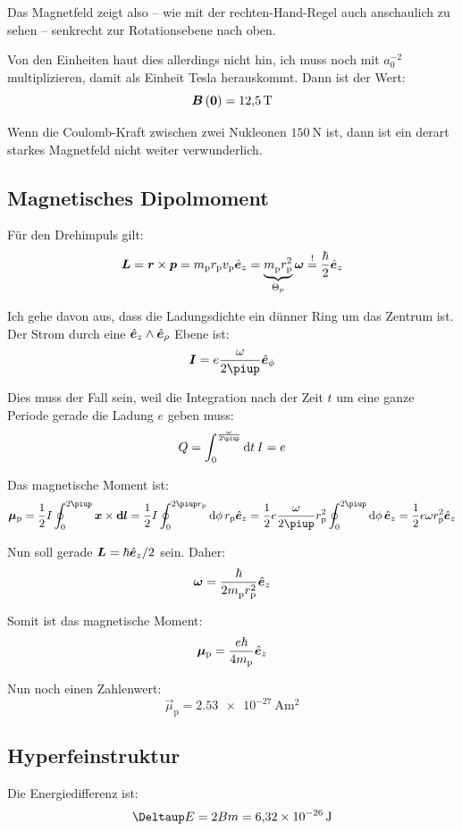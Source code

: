 Das Magnetfeld zeigt also – wie mit der rechten-Hand-Regel auch anschaulich zu
sehen – senkrecht zur Rotationsebene nach oben.

Von den Einheiten haut dies allerdings nicht hin, ich muss noch mit $a_0^{-2}$
multiplizieren, damit als Einheit Tesla herauskommt. Dann ist der Wert:
\[
	\vec B\del{\vec 0} = \SI{12.5}\tesla
\]

Wenn die Coulomb-Kraft zwischen zwei Nukleonen $\SI{150}\newton$ ist, dann ist
ein derart starkes Magnetfeld nicht weiter verwunderlich.

\subsection{Magnetisches Dipolmoment}

Für den Drehimpuls gilt:
\[
	\boldsymbol{L}
	= \boldsymbol{r} \times \boldsymbol{p}
	= m_\text{p} r_\text{p} v_\text{p} \hat{\boldsymbol{e}}_z
	= \underbrace{m_\text{p}^{} r_\text{p}^2}_{\Theta_\text{p}} \boldsymbol{\omega}
	\overset != \frac\hbar2 \hat{\boldsymbol{e}}_z
\]

Ich gehe davon aus, dass die Ladungsdichte ein dünner Ring um das Zentrum ist.
Der Strom durch eine $\hat{\boldsymbol{e}}_z \wedge \hat{\boldsymbol{e}}_\rho$ Ebene ist:
\[
	\vec I = e \frac{\omega}{2\piup} \ev_\phi
\]

Dies muss der Fall sein, weil die Integration nach der Zeit $t$ um eine ganze
Periode gerade die Ladung $e$ geben muss:
\[
	Q = \int_0^{\frac\omega{2\piup}} \dif t \, I = e
\]

Das magnetische Moment ist:
\[
	\vec\mu_\text{p}
	= \half I \oint_0^{2\piup} \vec x \times \vec{\dif l}
	= \half I \oint_0^{2\piup r_\text{p}} \dif \phi \, r_\text{p} \ev_z
	= \half e \frac{\omega}{2\piup} r_\text{p}^2 \oint_0^{2\piup} \dif \phi \, \ev_z
	= \half e \omega r_\text{p}^2 \ev_z
\]

Nun soll gerade $\boldsymbol{L} = \hbar \hat{\boldsymbol{e}}_z /2$ sein. Daher:
\[
	\boldsymbol{\omega} = \frac{\hbar}{2 m_\text{p}^{} r_\text{p}^2} \hat{\boldsymbol{e}}_z
\]

Somit ist das magnetische Moment:
\[
	\boldsymbol{\mu}_\text{p} = \frac{e \hbar}{4 m_\text{p}} \hat{\boldsymbol{e}}_z
\]

Nun noch einen Zahlenwert:
\[
	\vec\mu_\text{p} = \SI{2.53e-27}{\ampere\meter\squared}
\]

\subsection{Hyperfeinstruktur}

Die Energiedifferenz ist:
\[
	\Deltaup E = 2 B m = \SI{6.32e-26}\joule
\]

